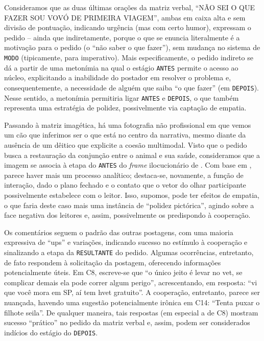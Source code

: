 \documentclass{textolivre}
\begin{document}
Consideramos que as duas últimas orações da matriz verbal, “NÃO SEI O QUE FAZER SOU VOVÓ DE PRIMEIRA VIAGEM”, ambas em caixa alta e sem divisão de pontuação, indicando urgência (mas com certo humor), expressam o pedido – ainda que indiretamente, porque o que se enuncia literalmente é a motivação para o pedido (o “não saber o que fazer”), sem mudança no sistema de \texttt{MODO} (tipicamente, para imperativo). Mais especificamente, o pedido indireto se dá a partir de uma metonímia na qual o estágio \texttt{ANTES} permite o acesso ao núcleo, explicitando a inabilidade do postador em resolver o problema e, consequentemente, a necessidade de alguém que saiba “o que fazer” (em \texttt{DEPOIS}). Nesse sentido, a metonímia permitiria ligar \texttt{ANTES} e \texttt{DEPOIS}, o que também representa uma estratégia de polidez, possivelmente via captação de empatia.

Passando à matriz imagética, há uma fotografia não profissional em que vemos um cão que inferimos ser o que está no centro da narrativa, mesmo diante da ausência de um dêitico que explicite a coesão multimodal. Visto que o pedido busca a restauração da conjunção entre o animal e sua saúde, consideramos que a imagem se associa à etapa do \texttt{ANTES} do \textit{frame} ilocucionário de \textcite{panther2017}. Com base em \textcite{kress2006}, parece haver mais um processo analítico; destaca-se, novamente, a função de interação, dado o plano fechado e o contato que o vetor do olhar participante possivelmente estabelece com o leitor. Isso, supomos, pode ter efeitos de empatia, o que faria deste caso mais uma instância de “polidez pictórica”, agindo sobre a face negativa dos leitores e, assim, possivelmente os predispondo à cooperação.

Os comentários seguem o padrão das outras postagens, com uma maioria expressiva de “ups” e variações, indicando sucesso no estímulo à cooperação e sinalizando a etapa da \texttt{RESULTANTE} do pedido. Algumas ocorrências, entretanto, de fato respondem à solicitação da postagem, oferecendo informações potencialmente úteis. Em C8, escreve-se que “o único jeito é levar no vet, se complicar demais ela pode correr algum perigo”, acrescentando, em resposta: “vi que você mora em SP, aí tem hvet gratuito”. A cooperação, entretanto, parece ser nuançada, havendo uma sugestão potencialmente irônica em C14: “Tenta puxar o filhote seila”. De qualquer maneira, tais respostas (em especial a de C8) mostram sucesso “prático” no pedido da matriz verbal e, assim, podem ser considerados indícios do estágio do \texttt{DEPOIS}.
\end{document}
